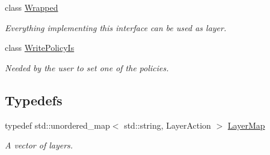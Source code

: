 \begin{DoxyCompactItemize}
class \hyperlink{classkdb_1_1Wrapped}{Wrapped}
\begin{DoxyCompactList}\small\item\em Everything implementing this interface can be used as layer. \end{DoxyCompactList}\item 
class \hyperlink{classkdb_1_1WritePolicyIs}{Write\+Policy\+Is}
\begin{DoxyCompactList}\small\item\em Needed by the user to set one of the policies. \end{DoxyCompactList}\end{DoxyCompactItemize}
\subsection*{Typedefs}
\begin{DoxyCompactItemize}
\item 
\mbox{\label{namespacekdb_ac389d72a0c7be0c026628870f81148fe}} 
typedef std\+::unordered\+\_\+map$<$ std\+::string, Layer\+Action $>$ \hyperlink{namespacekdb_ac389d72a0c7be0c026628870f81148fe}{Layer\+Map}
\begin{DoxyCompactList}\small\item\em A vector of layers. \end{DoxyCompactList}\end{DoxyCompactItemize}
